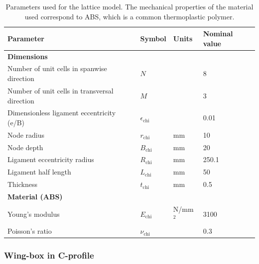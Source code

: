     \begin{table}[!htpb]
    \centering
    \begin{tabular}{|l|lll|}
    \hline
    \textbf{Parameter} & \multicolumn{1}{l|}{\textbf{Symbol}} & \multicolumn{1}{l|}{\textbf{Units}} & \textbf{Nominal value} \\ \hline \hline
    {\textbf{Dimensions}} &  &  &  \\ \hline
    Number of unit cells in spanwise direction & \multicolumn{1}{l|}{$N$} & \multicolumn{1}{l|}{} & 8 \\ \hline
    Number of unit cells in transversal direction & \multicolumn{1}{l|}{$M$} & \multicolumn{1}{l|}{} & 3 \\ \hline
    Dimensionless ligament eccentricity (e/B) & \multicolumn{1}{l|}{$\epsilon_{\mathrm{chi}}$} & \multicolumn{1}{l|}{} & 0.01 \\ \hline
    Node radius & \multicolumn{1}{l|}{$r_{\mathrm{chi}}$} & \multicolumn{1}{l|}{mm} & 10 \\ \hline
    Node depth & \multicolumn{1}{l|}{$B_{\mathrm{chi}}$} & \multicolumn{1}{l|}{mm} & 20 \\ \hline
    Ligament eccentricity radius & \multicolumn{1}{l|}{$R_{\mathrm{chi}}$} & \multicolumn{1}{l|}{mm} & 250.1 \\ \hline
    Ligament half length & \multicolumn{1}{l|}{$L_{\mathrm{chi}}$} & \multicolumn{1}{l|}{mm} & 50 \\ \hline
    Thickness & \multicolumn{1}{l|}{$t_{\mathrm{chi}}$} & \multicolumn{1}{l|}{mm} & 0.5 \\ \hline \hline
    {\textbf{Material (ABS)}} &  &  &  \\ \hline
    Young's modulus & \multicolumn{1}{l|}{$E_{\mathrm{chi}}$} & \multicolumn{1}{l|}{N/mm$^2$} & 3100 \\ \hline
    Poisson's ratio & \multicolumn{1}{l|}{$\nu_{\mathrm{chi}}$} & \multicolumn{1}{l|}{} & 0.3 \\ \hline
    \end{tabular}
    \caption[Parameters used for the lattice model]{Parameters used for the lattice model. The mechanical properties of the material used correspond to ABS, which is a common thermoplastic polymer.}
    \label{tab:parameters_lattice}
    \end{table}

    \clearpage
    \subsubsection{Wing-box in C-profile} \label{subsubsec:wingBox_Parametrization}

